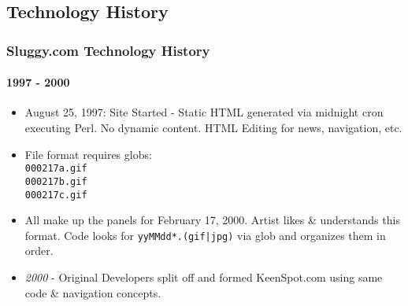 \documentclass{beamer}
\begin{document}
\subsection[About Sluggy.com]{Technology History}
\begin{frame}
\frametitle{Sluggy.com Technology History}
\framesubtitle{1997 - 2000}
	\begin{itemize}
		\item August 25, 1997: Site Started - Static HTML generated via midnight cron executing Perl.  No dynamic content.  HTML Editing for news, navigation, etc.
		\item File format requires globs: \texttt{\\000217a.gif\\000217b.gif\\000217c.gif} 
		\item All make up the panels for February 17, 2000.  Artist likes \& understands this format.  Code looks for \texttt{yyMMdd*.(gif|jpg)} via glob and organizes them in order.
		\item {\em 2000} - Original Developers split off and formed KeenSpot.com using same code \& navigation concepts.
	\end{itemize}
\end{frame}
\end{document}
